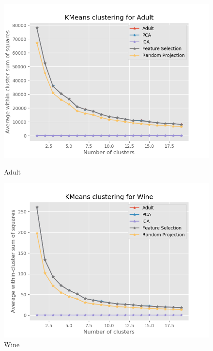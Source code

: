 \documentclass[11pt]{article}
\begin{document}
\begin{figure}[!htb]
   \begin{minipage}{0.5\textwidth}
     \centering
     \includegraphics[width=1.2\linewidth]{../figures/cluster_kmeans_adult.png}
     \caption{Adult}\label{Fig:cluster_kmeans_adult}
   \end{minipage}\hfill
   \begin{minipage}{0.5\textwidth}
     \centering
     \includegraphics[width=1.2\linewidth]{../figures/cluster_kmeans_wine.png}
     \caption{Wine}\label{Fig:cluster_kmeans_wine}
   \end{minipage}
\end{figure}
\end{document}
